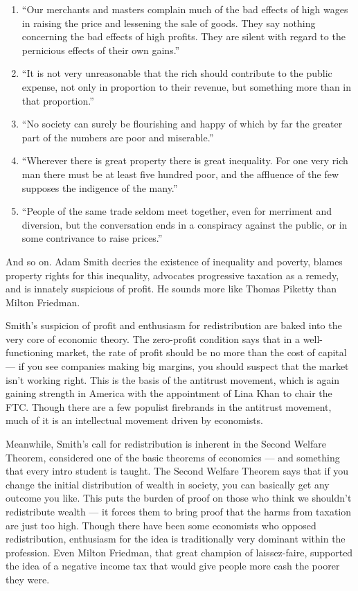\documentclass[
]{book}
\begin{document}
\begin{enumerate}
\def\labelenumi{\arabic{enumi}.}
\item
  ``Our merchants and masters complain much of the bad effects of high wages in raising the price and lessening the sale of goods. They say nothing concerning the bad effects of high profits. They are silent with regard to the pernicious effects of their own gains.''
\item
  ``It is not very unreasonable that the rich should contribute to the public expense, not only in proportion to their revenue, but something more than in that proportion.''
\item
  ``No society can surely be flourishing and happy of which by far the greater part of the numbers are poor and miserable.''
\item
  ``Wherever there is great property there is great inequality. For one very rich man there must be at least five hundred poor, and the affluence of the few supposes the indigence of the many.''
\item
  ``People of the same trade seldom meet together, even for merriment and diversion, but the conversation ends in a conspiracy against the public, or in some contrivance to raise prices.''
\end{enumerate}

And so on. Adam Smith decries the existence of inequality and poverty, blames property rights for this inequality, advocates progressive taxation as a remedy, and is innately suspicious of profit. He sounds more like Thomas Piketty than Milton Friedman.

Smith's suspicion of profit and enthusiasm for redistribution are baked into the very core of economic theory. The zero-profit condition says that in a well-functioning market, the rate of profit should be no more than the cost of capital --- if you see companies making big margins, you should suspect that the market isn't working right. This is the basis of the antitrust movement, which is again gaining strength in America with the appointment of Lina Khan to chair the FTC. Though there are a few populist firebrands in the antitrust movement, much of it is an intellectual movement driven by economists.

Meanwhile, Smith's call for redistribution is inherent in the Second Welfare Theorem, considered one of the basic theorems of economics --- and something that every intro student is taught. The Second Welfare Theorem says that if you change the initial distribution of wealth in society, you can basically get any outcome you like. This puts the burden of proof on those who think we shouldn't redistribute wealth --- it forces them to bring proof that the harms from taxation are just too high. Though there have been some economists who opposed redistribution, enthusiasm for the idea is traditionally very dominant within the profession. Even Milton Friedman, that great champion of laissez-faire, supported the idea of a negative income tax that would give people more cash the poorer they were.
\end{document}
